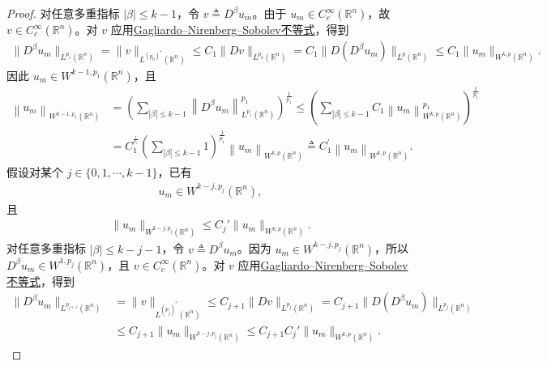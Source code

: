 \documentclass[../../main.tex]{subfiles}
\begin{document}
\begin{proof}
对任意多重指标 $|\beta|\leqslant k-1$，令 $v\triangleq D^{\beta}u_{m}$。由于 $u_{m}\in C_{c}^{\infty}(\mathbb{R}^{n})$，故 $v\in C_{c}^{\infty}(\mathbb{R}^{n})$。对 $v$ 应用\hyperref[theorem:Gagliardo--Nirenberg--Sobolev不等式]{Gagliardo--Nirenberg--Sobolev不等式}，得到
\begin{align*}
\|D^{\beta}u_{m}\|_{L^{p_{1}}(\mathbb{R}^{n})}
=\|v\|_{L^{(p_{0})^{*}}(\mathbb{R}^{n})}\leqslant C_{1}\|Dv\|_{L^{p_{0}}(\mathbb{R}^{n})}=C_{1}\|D(D^{\beta}u_{m})\|_{L^{p}(\mathbb{R}^{n})}\leqslant C_{1}\|u_{m}\|_{W^{k,p}(\mathbb{R}^{n})}.
\end{align*}
因此 $u_{m}\in W^{k-1,p_{1}}(\mathbb{R}^{n})$，且
\begin{align*}
\left\| u_m \right\| _{W^{k-1,p_1}\left( \mathbb{R} ^n \right)}&=\left( \sum_{\left| \beta \right|\leqslant k-1}{\left\| D^{\beta}u_m \right\| _{L^{p_1}\left( \mathbb{R} ^n \right)}^{p_1}} \right) ^{\frac{1}{p_1}}\leqslant \left( \sum_{\left| \beta \right|\leqslant k-1}{C_1\left\| u_m \right\| _{W^{k,p}\left( \mathbb{R} ^n \right)}^{p_1}} \right) ^{\frac{1}{p_1}}
\\
&=C_{1}^{^{\frac{1}{p_1}}}\left( \sum_{\left| \beta \right|\leqslant k-1}{1} \right) ^{\frac{1}{p_1}}\left\| u_m \right\| _{W^{k,p}\left( \mathbb{R} ^n \right)}\triangleq C_{1}^{\prime}\left\| u_m \right\| _{W^{k,p}\left( \mathbb{R} ^n \right)}.
\end{align*}
假设对某个 $j\in\{0,1,\cdots,k-1\}$，已有
\begin{align*}
u_{m}\in W^{k-j,p_{j}}(\mathbb{R}^{n}),
\end{align*}
且
\begin{align*}
\|u_{m}\|_{W^{k-j,p_{j}}(\mathbb{R}^{n})}\leqslant C_{j}'\|u_{m}\|_{W^{k,p}(\mathbb{R}^{n})}.
\end{align*}
对任意多重指标 $|\beta|\leqslant k-j-1$，令 $v\triangleq D^{\beta}u_{m}$。因为 $u_{m}\in W^{k-j,p_{j}}(\mathbb{R}^{n})$，所以 $D^{\beta}u_{m}\in W^{1,p_{j}}(\mathbb{R}^{n})$，且 $v\in C_{c}^{\infty}(\mathbb{R}^{n})$。对 $v$ 应用\hyperref[theorem:Gagliardo--Nirenberg--Sobolev不等式]{Gagliardo--Nirenberg--Sobolev不等式}，得到
\begin{align*}
\|D^{\beta}u_{m}\|_{L^{p_{j+1}}(\mathbb{R}^{n})}
&=\|v\|_{L^{(p_{j})^{*}}(\mathbb{R}^{n})}\leqslant C_{j+1}\|Dv\|_{L^{p_{j}}(\mathbb{R}^{n})}=C_{j+1}\|D(D^{\beta}u_{m})\|_{L^{p_{j}}(\mathbb{R}^{n})}\\
&\leqslant C_{j+1}\|u_{m}\|_{W^{k-j,p_{j}}(\mathbb{R}^{n})}\leqslant C_{j+1}C_{j}'\|u_{m}\|_{W^{k,p}(\mathbb{R}^{n})}.
\end{align*}

\end{proof}
\end{document}
